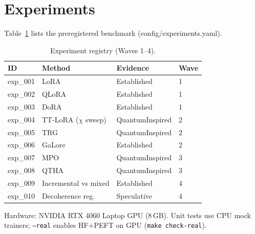 \section{Experiments}

Table~\ref{tab:experiments} lists the preregistered benchmark (config/experiments.yaml).

\begin{table}[h]
\centering
\caption{Experiment registry (Waves 1--4).}
\label{tab:experiments}
\begin{tabular}{llll}
\toprule
ID & Method & Evidence & Wave \\
\midrule
exp\_001 & LoRA & Established & 1 \\
exp\_002 & QLoRA & Established & 1 \\
exp\_003 & DoRA & Established & 1 \\
exp\_004 & TT-LoRA ($\chi$ sweep) & QuantumInspired & 2 \\
exp\_005 & TRG & QuantumInspired & 2 \\
exp\_006 & GaLore & Established & 2 \\
exp\_007 & MPO & QuantumInspired & 3 \\
exp\_008 & QTHA & QuantumInspired & 3 \\
exp\_009 & Incremental vs mixed & Established & 4 \\
exp\_010 & Decoherence reg. & Speculative & 4 \\
\bottomrule
\end{tabular}
\end{table}

Hardware: NVIDIA RTX 4060 Laptop GPU (8\,GB).
Unit tests use CPU mock trainers; \texttt{--real} enables HF+PEFT on GPU (\texttt{make check-real}).
